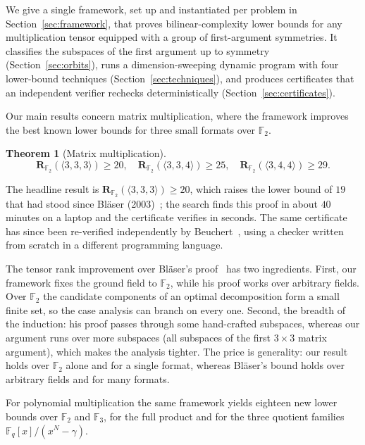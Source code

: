 \documentclass[11pt]{article}
\newtheorem{theorem}{Theorem}
\theoremstyle{definition}
\newcommand{\F}{\mathbb{F}}
\newcommand{\Rk}[2]{\mathbf{R}_{#1}(#2)}
\newcommand{\mmt}[3]{\langle #1,#2,#3\rangle}
\begin{document}
We give a single framework, set up and instantiated per problem in
Section~\ref{sec:framework}, that proves bilinear-complexity lower bounds for any
multiplication tensor equipped with a group of first-argument symmetries. It
classifies the subspaces of the first argument up to symmetry
(Section~\ref{sec:orbits}), runs a
dimension-sweeping dynamic program with four lower-bound techniques
(Section~\ref{sec:techniques}), and produces certificates that an independent
verifier rechecks deterministically (Section~\ref{sec:certificates}).

Our main results concern matrix multiplication, where the framework improves the
best known lower bounds for three small formats over $\F_2$.

\begin{theorem}[Matrix multiplication]\label{thm:matrix}
  \[
    \Rk{\F_2}{\mmt{3}{3}{3}}\ge 20,\quad
    \Rk{\F_2}{\mmt{3}{3}{4}}\ge 25,\quad
    \Rk{\F_2}{\mmt{3}{4}{4}}\ge 29.
  \]
\end{theorem}

The headline result is $\Rk{\F_2}{\mmt{3}{3}{3}}\ge 20$, which raises the lower bound of $19$ that had
stood since Bl\"aser (2003)~\cite{blaser2003complexity}; the search finds this proof
in about $40$ minutes on a laptop and the certificate verifies in seconds. The same
certificate has since been re-verified independently by
Beuchert~\cite{beuchert_2026_20752782}, using a checker written from scratch in a
different programming language.

The tensor rank improvement over Bl\"aser's proof~\cite{blaser2003complexity} has two ingredients.
First, our framework fixes the ground field to $\F_2$, while his proof works over
arbitrary fields. Over $\F_2$ the candidate components of an optimal
decomposition form a small finite set, so the case analysis can branch on
every one. Second, the breadth of the induction: his proof passes through
some hand-crafted subspaces, whereas our argument runs
over more subspaces (all subspaces of the first $3\times 3$ matrix
argument), which makes the analysis tighter. The price is generality:
our result holds over $\F_2$ alone and for a single format,
whereas Bl\"aser's bound holds over arbitrary fields and for many formats.

For polynomial multiplication the same framework yields eighteen new lower bounds
over $\F_2$ and $\F_3$, for the full product and for the
three quotient families $\F_q[x]/(x^N-\gamma)$.
\end{document}
